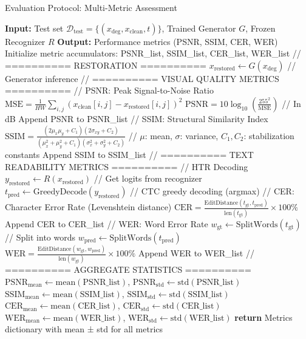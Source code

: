\documentclass[12pt,a4paper]{article}
\begin{document}
\begin{algorithm}[H]
\caption{Evaluation Protocol: Multi-Metric Assessment}
\label{alg:evaluation-protocol}
\small
\begin{algorithmic}[1]
\STATE \textbf{Input:} Test set $\mathcal{D}_{\text{test}} = \{(x_{\text{deg}}, x_{\text{clean}}, t)\}$, Trained Generator $G$, Frozen Recognizer $R$
\STATE \textbf{Output:} Performance metrics (PSNR, SSIM, CER, WER)
\STATE
\STATE Initialize metric accumulators: PSNR\_list, SSIM\_list, CER\_list, WER\_list
\STATE
{}
    \STATE // ========== RESTORATION ==========
    \STATE $x_{\text{restored}} \gets G(x_{\text{deg}})$ \quad // Generator inference
    \STATE
    \STATE // ========== VISUAL QUALITY METRICS ==========
    \STATE // PSNR: Peak Signal-to-Noise Ratio
    \STATE $\text{MSE} = \frac{1}{HW} \sum_{i,j} (x_{\text{clean}}[i,j] - x_{\text{restored}}[i,j])^2$
    \STATE $\text{PSNR} = 10 \log_{10} \left( \frac{255^2}{\text{MSE}} \right)$ \quad // In dB
    \STATE Append PSNR to PSNR\_list
    \STATE
    \STATE // SSIM: Structural Similarity Index
    \STATE $\text{SSIM} = \frac{(2\mu_x\mu_y + C_1)(2\sigma_{xy} + C_2)}{(\mu_x^2 + \mu_y^2 + C_1)(\sigma_x^2 + \sigma_y^2 + C_2)}$
    \STATE \quad // $\mu$: mean, $\sigma$: variance, $C_1, C_2$: stabilization constants
    \STATE Append SSIM to SSIM\_list
    \STATE
    \STATE // ========== TEXT READABILITY METRICS ==========
    \STATE // HTR Decoding
    \STATE $y_{\text{restored}} \gets R(x_{\text{restored}})$ \quad // Get logits from recognizer
    \STATE $t_{\text{pred}} \gets \text{GreedyDecode}(y_{\text{restored}})$ \quad // CTC greedy decoding (argmax)
    \STATE
    \STATE // CER: Character Error Rate (Levenshtein distance)
    \STATE $\text{CER} = \frac{\text{EditDistance}(t_{\text{gt}}, t_{\text{pred}})}{\text{len}(t_{\text{gt}})} \times 100\%$
    \STATE Append CER to CER\_list
    \STATE
    \STATE // WER: Word Error Rate
    \STATE $w_{\text{gt}} \gets \text{SplitWords}(t_{\text{gt}})$ \quad // Split into words
    \STATE $w_{\text{pred}} \gets \text{SplitWords}(t_{\text{pred}})$
    \STATE $\text{WER} = \frac{\text{EditDistance}(w_{\text{gt}}, w_{\text{pred}})}{\text{len}(w_{\text{gt}})} \times 100\%$
    \STATE Append WER to WER\_list
\ENDFOR
\STATE
\STATE // ========== AGGREGATE STATISTICS ==========
\STATE $\text{PSNR}_{\text{mean}} \gets \text{mean}(\text{PSNR\_list})$, $\text{PSNR}_{\text{std}} \gets \text{std}(\text{PSNR\_list})$
\STATE $\text{SSIM}_{\text{mean}} \gets \text{mean}(\text{SSIM\_list})$, $\text{SSIM}_{\text{std}} \gets \text{std}(\text{SSIM\_list})$
\STATE $\text{CER}_{\text{mean}} \gets \text{mean}(\text{CER\_list})$, $\text{CER}_{\text{std}} \gets \text{std}(\text{CER\_list})$
\STATE $\text{WER}_{\text{mean}} \gets \text{mean}(\text{WER\_list})$, $\text{WER}_{\text{std}} \gets \text{std}(\text{WER\_list})$
\STATE
\STATE \textbf{return} Metrics dictionary with mean ± std for all metrics
\end{algorithmic}
\end{algorithm}
\end{document}
